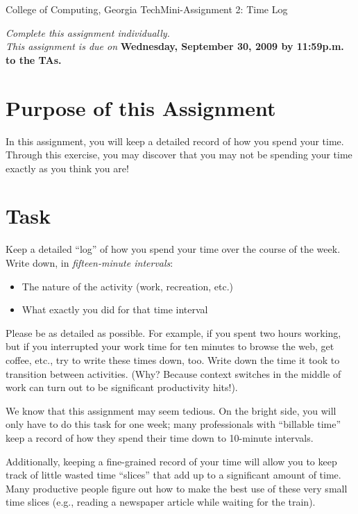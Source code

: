 \documentclass[11pt]{article}
\begin{document}


{College of Computing, Georgia Tech}{Mini-Assignment 2: Time Log}

{\em Complete this assignment individually. \\  This
  assignment is due on} {\bf Wednesday, September 30, 2009 by 11:59p.m. to
  the TAs.}

\section{Purpose of this Assignment}

In this assignment, you will keep a detailed record of how you spend
your time.  Through this exercise, you may discover that you may not be
spending your time exactly as you think you are!

\section{Task}

Keep a detailed ``log'' of how you spend your time over the course of
the week.  Write down, in {\em fifteen-minute intervals}:
\begin{itemize}
\item The nature of the activity (work, recreation, etc.)
\item What exactly you did for that time interval
\end{itemize}

Please be as detailed as possible.  For example, if you spent two hours
working, but if you interrupted your work time for ten minutes to browse
the web, get coffee, etc., try to write these times down, too.  Write
down the time it took to transition between activities.  (Why?  Because
context switches in the middle of work can turn out to be significant
productivity hits!).

We know that this assignment may seem tedious.  On the bright side, you
will only have to do this task for one week; many professionals with
``billable time'' keep a record of how they spend their time down to
10-minute intervals.   

Additionally, keeping a fine-grained record of your time will allow you
to keep track of little wasted time ``slices'' that add up to a
significant amount of time.  Many productive people figure out how to
make the best use of these very small time slices (e.g., reading a
newspaper article while waiting for the train).
\end{document}
